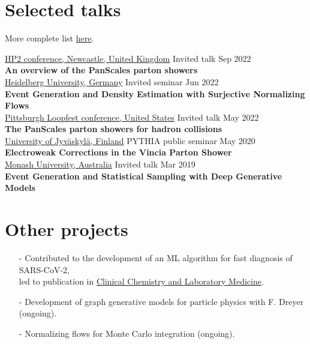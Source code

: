 \documentclass[a4paper,11pt]{article}
\begin{document}
\section{Selected talks}
More complete list \href{https://rbvh.github.io/}{here}.

\underline{HP2 conference, Newcastle, United Kingdom} Invited talk \hfill  Sep 2022 \\[1.75pt]
\textbf{An overview of the PanScales parton showers}  \\[3.5pt]
\underline{Heidelberg University, Germany} Invited seminar \hfill Jun 2022 \\[1.75pt]
\textbf{Event Generation and Density Estimation with Surjective Normalizing Flows}  \\[3.5pt]
\underline{Pittsburgh Loopfest conference, United States} Invited talk \hfill May 2022 \\[1.75pt]
\textbf{The PanScales parton showers for hadron collisions}  \\[3.5pt]
\underline{University of Jyväskylä, Finland} PYTHIA public seminar \hfill May 2020 \\[1.75pt]
\textbf{Electroweak Corrections in the Vincia Parton Shower}  \\[3.5pt]
\underline{Monash University, Australia} Invited talk \hfill Mar 2019 \\[1.75pt]
\textbf{Event Generation and Statistical Sampling with Deep Generative Models} 


\section{Other projects}
\begin{itemize}
    \setlength\itemsep{-.5em}
    \item[-] Contributed to the development of an ML algorithm for fast diagnosis of SARS-CoV-2, \\ led to publication in \href{https://www.degruyter.com/document/doi/10.1515/cclm-2020-0593/html}{Clinical Chemistry and Laboratory Medicine}.
    \item[-] Development of graph generative models for particle physics with F. Dreyer (ongoing).
    \item[-] Normalizing flows for Monte Carlo integration (ongoing).
\end{itemize}
\end{document}
